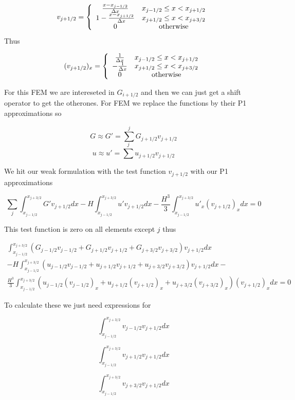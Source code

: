 \documentclass[12pt]{article}
\begin{document}
\[v_{j + 1/2} = \left\lbrace \begin{array}{c c}
\frac{x - x_{j-1/2}}{\Delta x}  & x_{j - 1/2} \le x < x_{j+1/2} \\
1 - \frac{x - x_{j+1/2}}{\Delta x}  & x_{j + 1/2} \le x < x_{j+3/2}\\
0 & \text{otherwise}
\end{array} \right.\]
Thus

\[(v_{j + 1/2})_{x} = \left\lbrace \begin{array}{c c}
\frac{1}{\Delta x}  & x_{j - 1/2} \le x < x_{j+1/2} \\
- \frac{1}{\Delta x}  & x_{j + 1/2} \le x < x_{j+3/2}\\
0 & \text{otherwise}
\end{array} \right.\]

For this FEM we are intereseted in $G_{i+1/2}$ and then we can just get a shift operator to get the otherones. For FEM we replace the functions by their P1 approximations so

\[G \approx G' = \sum^{j}G_{j+ 1/2}v_{j+ 1/2}\]
\[u \approx u' = \sum^{j}u_{j+ 1/2}v_{j+ 1/2}\]

We hit our weak formulation with the test function $v_{j + 1/2}$ with our P1 approximations

\[\sum_{j}\int_{x_{j-1/2}}^{x_{j+3/2}} G'v_{j+ 1/2} dx - H\int_{x_{j-1/2}}^{x_{j+3/2}} u'v_{j+ 1/2} dx -  \frac{H^3}{3}\int_{x_{j-1/2}}^{x_{j+3/2}}u'_{x}(v_{j+ 1/2})_{x}dx = 0 \]

This test function is zero on all elements except $j$ thus

\begin{multline}
\int_{x_{j-1/2}}^{x_{j+3/2}} \left(G_{j- 1/2}v_{j- 1/2} + G_{j+ 1/2}v_{j+ 1/2} +G_{j+3/2}v_{j+3/2}   \right)v_{j+ 1/2} dx \\ - H\int_{x_{j-1/2}}^{x_{j+3/2}} \left(u_{j- 1/2}v_{j- 1/2} + u_{j+ 1/2}v_{j+ 1/2} +u_{j+3/2}v_{j+3/2}   \right)v_{j+ 1/2} dx - \\ \frac{H^3}{3}\int_{x_{j-1/2}}^{x_{j+3/2}}\left(u_{j- 1/2}(v_{j- 1/2})_{x} + u_{j+ 1/2}(v_{j+ 1/2})_{x} +u_{j+3/2}(v_{j+ 3 /2})_{x}   \right)(v_{j+ 1/2})_{x}dx = 0
\end{multline}

To calculate these we just need expressions for 

\[\int_{x_{j-1/2}}^{x_{j+3/2}}v_{j- 1/2}v_{j+ 1/2} dx\]

\[\int_{x_{j-1/2}}^{x_{j+3/2}}v_{j+ 1/2}v_{j+ 1/2} dx\]

\[\int_{x_{j-1/2}}^{x_{j+3/2}}v_{j+3/2}v_{j+ 1/2} dx\]
\end{document}
